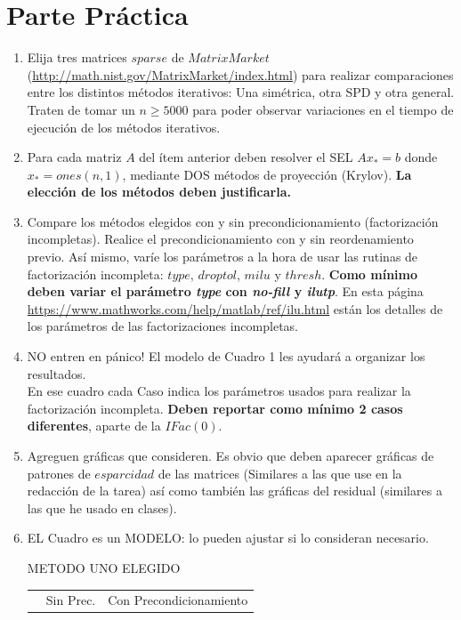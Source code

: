 \documentclass{article}
\begin{document}
\section*{Parte Práctica}
\begin{enumerate}
\item Elija tres matrices $sparse$ de $MatrixMarket$\\
(\url{http://math.nist.gov/MatrixMarket/index.html}) para realizar comparaciones entre los distintos métodos iterativos: Una simétrica, otra SPD y otra general. Traten de tomar un $n\geq 5000$ para poder observar variaciones en el tiempo de ejecución de los métodos iterativos.
\item Para cada matriz $A$ del ítem anterior deben resolver el SEL $Ax_{*}=b$ donde $x_{*} = ones(n,1)$, mediante DOS métodos de proyección (Krylov). {\bf La elección de los métodos deben justificarla.}
\item Compare los métodos elegidos con y sin precondicionamiento (factorización incompletas). Realice el precondicionamiento con y sin reordenamiento previo. Así mismo, varíe los parámetros a la hora de usar las rutinas de factorización incompleta: $type$, $droptol$, $milu$ y $thresh$. {\bf Como mínimo deben variar el parámetro \textit{type} con \textit{no-fill} y \textit{ilutp}}. En esta página \url{https://www.mathworks.com/help/matlab/ref/ilu.html} están los detalles de los parámetros de las factorizaciones incompletas.
\item NO entren en pánico! El modelo de Cuadro 1 les ayudará a organizar los resultados.\\
En ese cuadro cada Caso indica los parámetros usados para realizar la factorización incompleta. {\bf Deben reportar como mínimo 2 casos diferentes}, aparte de la $IFac(0)$.
\item Agreguen gráficas que consideren. Es obvio que deben aparecer gráficas de patrones de $esparcidad$ de las matrices (Similares a las que use en la redacción de la tarea) así como también las gráficas del residual (similares a las que he usado en clases).
\item EL Cuadro es un MODELO: lo pueden ajustar si lo consideran necesario.
\begin{table}[H]

\centering
METODO UNO ELEGIDO
\begin{tabular}{|c||c||c|c|c||c|c|c|}
\hline
& \multirow{2}{*}{Sin  Prec.} &

\multicolumn{6}{|c|}{Con Precondicionamiento} \\


\end{tabular}
\end{table}
\end{enumerate}
\end{document}
